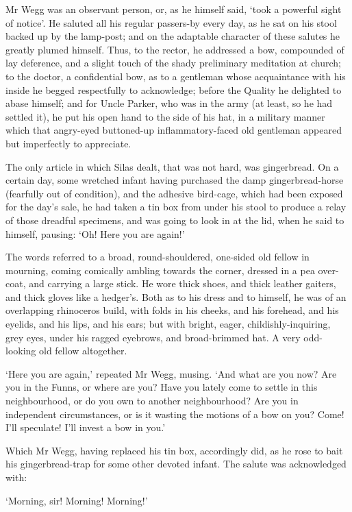 Mr Wegg was an observant person, or, as he himself said, ‘took a
powerful sight of notice’. He saluted all his regular passers-by every
day, as he sat on his stool backed up by the lamp-post; and on the
adaptable character of these salutes he greatly plumed himself. Thus,
to the rector, he addressed a bow, compounded of lay deference, and
a slight touch of the shady preliminary meditation at church; to the
doctor, a confidential bow, as to a gentleman whose acquaintance with
his inside he begged respectfully to acknowledge; before the Quality he
delighted to abase himself; and for Uncle Parker, who was in the army
(at least, so he had settled it), he put his open hand to the side
of his hat, in a military manner which that angry-eyed buttoned-up
inflammatory-faced old gentleman appeared but imperfectly to appreciate.

The only article in which Silas dealt, that was not hard, was
gingerbread. On a certain day, some wretched infant having purchased the
damp gingerbread-horse (fearfully out of condition), and the adhesive
bird-cage, which had been exposed for the day’s sale, he had taken a tin
box from under his stool to produce a relay of those dreadful specimens,
and was going to look in at the lid, when he said to himself, pausing:
‘Oh! Here you are again!’

The words referred to a broad, round-shouldered, one-sided old fellow in
mourning, coming comically ambling towards the corner, dressed in a pea
over-coat, and carrying a large stick. He wore thick shoes, and thick
leather gaiters, and thick gloves like a hedger’s. Both as to his dress
and to himself, he was of an overlapping rhinoceros build, with folds
in his cheeks, and his forehead, and his eyelids, and his lips, and his
ears; but with bright, eager, childishly-inquiring, grey eyes, under his
ragged eyebrows, and broad-brimmed hat. A very odd-looking old fellow
altogether.

‘Here you are again,’ repeated Mr Wegg, musing. ‘And what are you now?
Are you in the Funns, or where are you? Have you lately come to settle
in this neighbourhood, or do you own to another neighbourhood? Are you
in independent circumstances, or is it wasting the motions of a bow on
you? Come! I’ll speculate! I’ll invest a bow in you.’

Which Mr Wegg, having replaced his tin box, accordingly did, as he rose
to bait his gingerbread-trap for some other devoted infant. The salute
was acknowledged with:

‘Morning, sir! Morning! Morning!’

